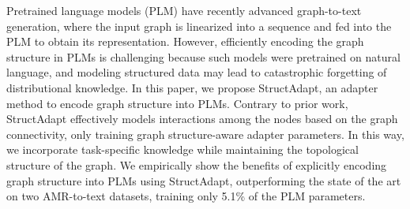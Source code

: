 Pretrained language models (PLM) have recently advanced graph-to-text generation, where the input graph is linearized into a sequence and fed into the PLM to obtain its representation. However, efficiently encoding the graph structure in PLMs is challenging because such models were pretrained on natural language, and modeling structured data may lead to catastrophic forgetting of distributional knowledge. In this paper, we propose StructAdapt, an adapter method to encode graph structure into PLMs. Contrary to prior work, StructAdapt effectively models interactions among the nodes based on the graph connectivity, only training graph structure-aware adapter parameters. In this way, we incorporate task-specific knowledge while maintaining the topological structure of the graph. We empirically show the benefits of explicitly encoding graph structure into PLMs using StructAdapt, outperforming the state of the art on two AMR-to-text datasets, training only 5.1\% of the PLM parameters.
